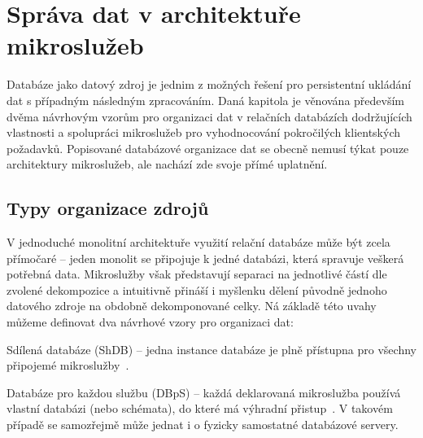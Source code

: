 \chapter{Správa dat v architektuře mikroslužeb}\label{ch:msa-data}


Databáze jako datový zdroj je jednim z možných řešení pro persistentní ukládání dat s případným následným zpracováním.
Daná kapitola je věnována především dvěma návrhovým vzorům pro organizaci dat v relačních databázích dodržujících  vlastnosti a spolupráci mikroslužeb pro vyhodnocování pokročilých klientských požadavků.
Popisované databázové organizace dat se obecně nemusí týkat pouze architektury mikroslužeb, ale nachází zde svoje přímé uplatnění.



\section{Typy organizace zdrojů}\label{sec:msa-db-as-data-source}

V jednoduché monolitní architektuře využití relační databáze může být zcela přímočaré – jeden monolit se připojuje k jedné databázi, která spravuje veškerá potřebná data.
Mikroslužby však představují separaci na jednotlivé částí dle zvolené dekompozice a intuitivně přináší i myšlenku dělení původně jednoho datového zdroje na obdobně dekomponované celky.
Ná základě této uvahy můžeme definovat dva návrhové vzory pro organizaci dat:

\begin{dl}
   \item [Sdílená databáze (ShDB)] – jedna instance databáze je plně přístupna pro všechny připojemé mikroslužby~\cite{shareddb}.
   \item [Databáze pro každou službu (DBpS)] – každá deklarovaná mikroslužba používá vlastní databázi (nebo schémata), do které má výhradní přistup~\cite{dbperservice}.
   V takovém případě se samozřejmě může jednat i o fyzicky samostatné databázové servery.
\end{dl}


